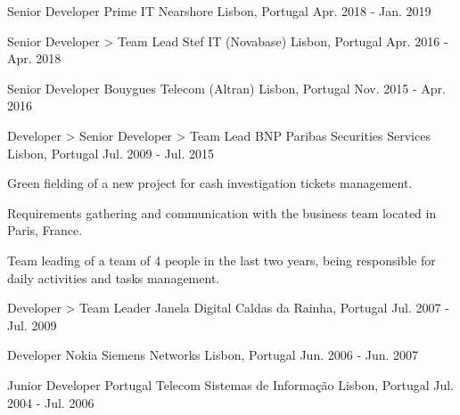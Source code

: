 \begin{cventries}
  \cventry
    {Senior Developer} %
    {Prime IT Nearshore} %
    {Lisbon, Portugal} %
    {Apr. 2018 - Jan. 2019} %
    {
    }

  \cventry
    {Senior Developer > Team Lead} %
    {Stef IT (Novabase)} %
    {Lisbon, Portugal} %
    {Apr. 2016 - Apr. 2018} %
    {
    }

  \cventry
    {Senior Developer} %
    {Bouygues Telecom (Altran)} %
    {Lisbon, Portugal} %
    {Nov. 2015 - Apr. 2016} %
    {
    }

  \cventry
    {Developer > Senior Developer > Team Lead} %
    {BNP Paribas Securities Services} %
    {Lisbon, Portugal} %
    {Jul. 2009 - Jul. 2015} %
    {
      \begin{cvitems} %
        \item {Green fielding of a new project for cash investigation tickets management.}
        \item {Requirements gathering and communication with the business team located in Paris, France.}
        \item {Team leading of a team of 4 people in the last two years, being responsible for daily activities and tasks management.}
      \end{cvitems}
    }

  \cventry
    {Developer > Team Leader} %
    {Janela Digital} %
    {Caldas da Rainha, Portugal} %
    {Jul. 2007 - Jul. 2009} %
    {
    }

  \cventry
    {Developer} %
    {Nokia Siemens Networks} %
    {Lisbon, Portugal} %
    {Jun. 2006 - Jun. 2007} %
    {
    }

  \cventry
    {Junior Developer} %
    {Portugal Telecom Sistemas de Informação} %
    {Lisbon, Portugal} %
    {Jul. 2004 - Jul. 2006} %
    {
    }

\end{cventries}
